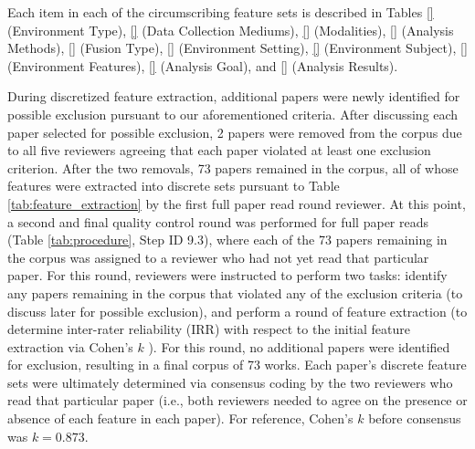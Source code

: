 \documentclass[manuscript,screen,review]{acmart}
\begin{document}
Each item in each of the circumscribing feature sets is described in Tables \ref{} (Environment Type), \ref{} (Data Collection Mediums), \ref{} (Modalities), \ref{} (Analysis Methods), \ref{} (Fusion Type), \ref{} (Environment Setting), \ref{} (Environment Subject), \ref{} (Environment Features), \ref{} (Analysis Goal), and \ref{} (Analysis Results).

During discretized feature extraction, additional papers were newly identified for possible exclusion pursuant to our aforementioned criteria. After discussing each paper selected for possible exclusion, 2 papers were removed from the corpus due to all five reviewers agreeing that each paper violated at least one exclusion criterion. After the two removals, 73 papers remained in the corpus, all of whose features were extracted into discrete sets pursuant to Table \ref{tab:feature_extraction} by the first full paper read round reviewer. At this point, a second and final quality control round was performed for full paper reads (Table \ref{tab:procedure}, Step ID 9.3), where each of the 73 papers remaining in the corpus was assigned to a reviewer who had not yet read that particular paper. For this round, reviewers were instructed to perform two tasks: identify any papers remaining in the corpus that violated any of the exclusion criteria (to discuss later for possible exclusion), and perform a round of feature extraction (to determine inter-rater reliability (IRR) with respect to the initial feature extraction via Cohen's $k$ \cite{cohen1960coefficient}). For this round, no additional papers were identified for exclusion, resulting in a final corpus of 73 works. Each paper's discrete feature sets were ultimately determined via consensus coding \cite{} by the two reviewers who read that particular paper (i.e., both reviewers needed to agree on the presence or absence of each feature in each paper). For reference, Cohen's $k$ before consensus was $k=0.873$.  


\end{document}
